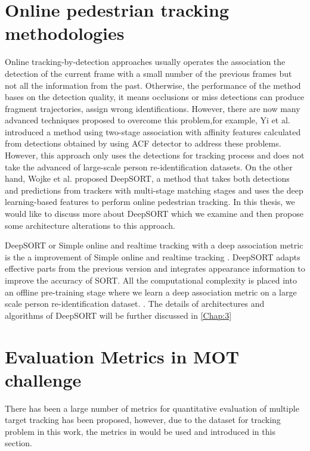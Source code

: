 \section{Online pedestrian tracking methodologies}
\hspace{0.45cm} Online tracking-by-detection approaches usually operates the association the
detection of the current frame with a small number of the previous frames but not all the
information from the past. Otherwise, the performance of the method bases on the detection quality,
it means occlusions or miss detections can produce fragment trajectories, assign wrong
identifications. However, there are now many advanced techniques proposed to overcome this
problem,for example, Yi et al. \cite{MultiTracking} introduced a method using two-stage association with affinity features
calculated from detections obtained by using ACF detector to address these problems. However, this approach
only uses the detections for tracking process and does not take the advanced of large-scale person re-identification datasets.
On the other hand, Wojke et al. \cite{Wojke2017simple} proposed DeepSORT, a method that takes both detections and predictions 
from trackers with multi-stage matching stages and uses the deep learning-based features to perform online pedestrian tracking.
In this thesis, we would like to discuss more about DeepSORT\cite{Wojke2017simple} which we examine and then propose some architecture alterations to this approach.\par

DeepSORT or Simple online and realtime tracking with a deep association metric \cite{Wojke2017simple} is 
the a improvement of Simple online and realtime tracking \cite{sort} . DeepSORT\cite{Wojke2017simple} adapts effective parts from the previous version and integrates appearance information to improve the accuracy of SORT. All the computational complexity is placed 
into an offline pre-training stage where we learn a deep association metric on a large scale person re-identification dataset. \cite{Wojke2017simple}. The details of architectures
and algorithms of DeepSORT\cite{Wojke2017simple} will be further discussed in \autoref{Chap:3}





\section{Evaluation Metrics in MOT challenge}
\hspace{0.45cm}There has been a large number of metrics for quantitative evaluation of multiple target tracking has been proposed, however, due to the dataset for tracking problem in this work, the metrics in \cite{Milan2016MOT16AB} would be used and introduced in this section.
